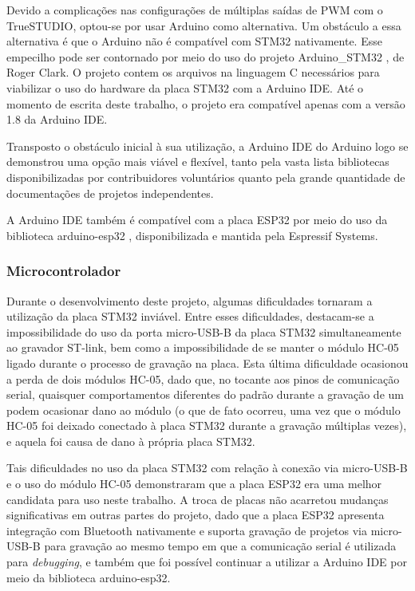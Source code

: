 Devido a complicações nas configurações de múltiplas saídas de PWM com o 
TrueSTUDIO, optou-se por usar Arduino como alternativa. Um obstáculo a essa
alternativa é que o Arduino não é compatível com STM32 nativamente. Esse
empecilho pode ser contornado por meio do uso do projeto Arduino\_STM32
\cite{arduino_stm32}, de Roger Clark. O projeto contem os arquivos na linguagem
C necessários para viabilizar o uso do hardware da placa STM32 com a Arduino IDE.
Até o momento de escrita deste trabalho, o projeto era compatível apenas com a
versão 1.8 da Arduino IDE.

Transposto o obstáculo inicial à sua utilização, a Arduino IDE do Arduino 
logo se demonstrou uma opção mais viável e flexível, tanto pela vasta lista
bibliotecas disponibilizadas por contribuidores voluntários quanto pela grande
quantidade de documentações de projetos independentes.

A Arduino IDE também é compatível com a placa ESP32 por meio do uso da
biblioteca arduino-esp32 \cite{arduino_esp32}, disponibilizada e mantida
pela Espressif Systems.

\subsubsection{Microcontrolador}

Durante o desenvolvimento deste projeto, algumas dificuldades tornaram a
utilização da placa STM32 inviável. Entre esses dificuldades, destacam-se a
impossibilidade do uso da porta micro-USB-B da placa STM32 simultaneamente ao
gravador ST-link, bem como a impossibilidade de se manter o módulo HC-05 ligado
durante o processo de gravação na placa. Esta última dificuldade ocasionou a
perda de dois módulos HC-05, dado que, no tocante aos pinos de comunicação serial,
quaisquer comportamentos diferentes do padrão durante a gravação de um podem
ocasionar dano ao módulo (o que de fato ocorreu, uma vez que o módulo HC-05 foi
deixado conectado à placa STM32 durante a gravação múltiplas vezes), e aquela
foi causa de dano à própria placa STM32.

Tais dificuldades no uso da placa STM32 com relação à conexão via micro-USB-B e
o uso do módulo HC-05 demonstraram que a placa ESP32 era uma melhor candidata 
para uso neste trabalho. A troca de placas não acarretou mudanças significativas
em outras partes do projeto, dado que a placa ESP32 apresenta integração
com Bluetooth nativamente e suporta gravação de projetos via micro-USB-B
para gravação ao mesmo tempo em que a comunicação serial é utilizada para
\textit{debugging}, e também que foi possível continuar a utilizar a Arduino IDE
por meio da biblioteca arduino-esp32.